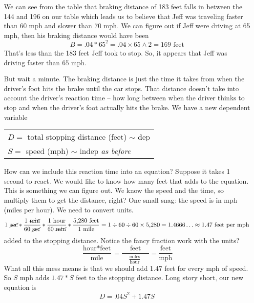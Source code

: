 We can see from the table that braking distance of 183 feet falls in between the 144 and 196 on our table which leads us to believe that Jeff was traveling faster than 60 mph and slower than 70 mph.  We can figure out if Jeff were driving at 65 mph, then his braking distance would have been 
$$B = .04 \ast 65^2 = .04\times \underline{65} \wedge 2 = 169 \text{ feet}$$  That's less than the 183 feet Jeff took to stop.  So, it appears that Jeff was driving faster than 65 mph. 

But wait a minute.  The braking distance is just the time it takes from when the driver's foot hits the brake until the car stops.  That distance doesn't take into account the driver's reaction time -- how long between when the driver thinks to stop and when the driver's foot actually hits the brake.  We have a new dependent variable
\begin{center}
\begin{tabular} {l} 
$D=$ total stopping distance (feet) $\sim$ dep \\ 
$S=$ speed (mph) $\sim$ indep \quad \emph{as before}\\
\end{tabular}
\end{center}

How can we include this reaction time into an equation?  Suppose it takes 1 second to react.  We would like to know how many feet that adds to the equation.  This is something we can figure out.  We know the speed and the time, so multiply them to get the distance, right?  One small snag:  the speed is in mph (miles per hour).  We need to convert units.    
$$1 \text{ \cancel{sec}} \ast \frac{1 \text{ \cancel{min}}}{60 \text{ \cancel{sec}}} \ast \frac{1 \text{ hour}}{60 \text{ \cancel{min}}} \ast \frac{\text{5,280 feet}}{1 \text{ mile}}=1 \div 60 \div 60 \times \text{5,280}= 1.4666\ldots \approx 1.47 \text{ feet per mph}$$
added to the stopping distance. 
Notice the fancy fraction work  with the units?
$$\frac{\text{hour}\ast \text{feet}}{\text{mile}}=\frac{\text{feet}}{\quad \frac{\text{miles}}{\text{hour}}\quad~}=\frac{\text{feet}}{\text{mph}}$$
What all this mess means is that we should add 1.47 feet for every mph of speed.  
So $S$ mph adds $1.47\ast S$ feet to the stopping distance.
 Long story short, our new equation is
 $$D=.04S^2+1.47S$$

